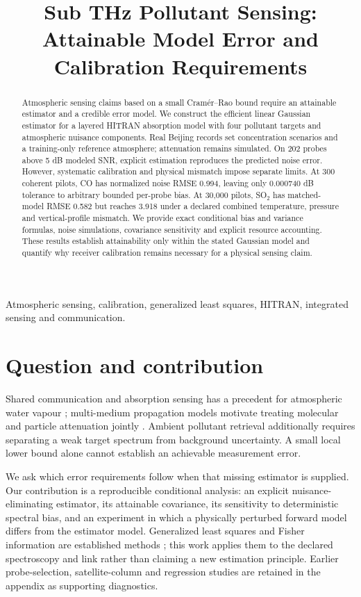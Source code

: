 \documentclass[conference]{IEEEtran}
\title{Sub THz Pollutant Sensing: Attainable Model Error and Calibration Requirements}
\author{
\IEEEauthorblockN{Guillem Moreno Garcia}
\IEEEauthorblockA{
Universitat Polit\`ecnica de Catalunya\\
Email: guillem.moreno.garcia@estudiantat.upc.edu}
}
\begin{document}
\maketitle

\begin{abstract}
Atmospheric sensing claims based on a small Cram\'er--Rao bound require an attainable estimator and a credible error model. We construct the efficient linear Gaussian estimator for a layered HITRAN absorption model with four pollutant targets and atmospheric nuisance components. Real Beijing records set concentration scenarios and a training-only reference atmosphere; attenuation remains simulated. On 202 probes above 5 dB modeled SNR, explicit estimation reproduces the predicted noise error. However, systematic calibration and physical mismatch impose separate limits. At 300 coherent pilots, CO has normalized noise RMSE 0.994, leaving only 0.000740 dB tolerance to arbitrary bounded per-probe bias. At 30,000 pilots, SO$_2$ has matched-model RMSE 0.582 but reaches 3.918 under a declared combined temperature, pressure and vertical-profile mismatch. We provide exact conditional bias and variance formulas, noise simulations, covariance sensitivity and explicit resource accounting. These results establish attainability only within the stated Gaussian model and quantify why receiver calibration remains necessary for a physical sensing claim.
\end{abstract}
\begin{IEEEkeywords}
Atmospheric sensing, calibration, generalized least squares, HITRAN, integrated sensing and communication.
\end{IEEEkeywords}

\section{Question and contribution}
Shared communication and absorption sensing has a precedent for atmospheric water vapour \cite{aliaga2024dar}; multi-medium propagation models motivate treating molecular and particle attenuation jointly \cite{yang2024attenuation}. Ambient pollutant retrieval additionally requires separating a weak target spectrum from background uncertainty. A small local lower bound alone cannot establish an achievable measurement error.

We ask which error requirements follow when that missing estimator is supplied. Our contribution is a reproducible conditional analysis: an explicit nuisance-eliminating estimator, its attainable covariance, its sensitivity to deterministic spectral bias, and an experiment in which a physically perturbed forward model differs from the estimator model. Generalized least squares and Fisher information are established methods \cite{kay1993}; this work applies them to the declared spectroscopy and link rather than claiming a new estimation principle. Earlier probe-selection, satellite-column and regression studies are retained in the appendix as supporting diagnostics.
\end{document}
